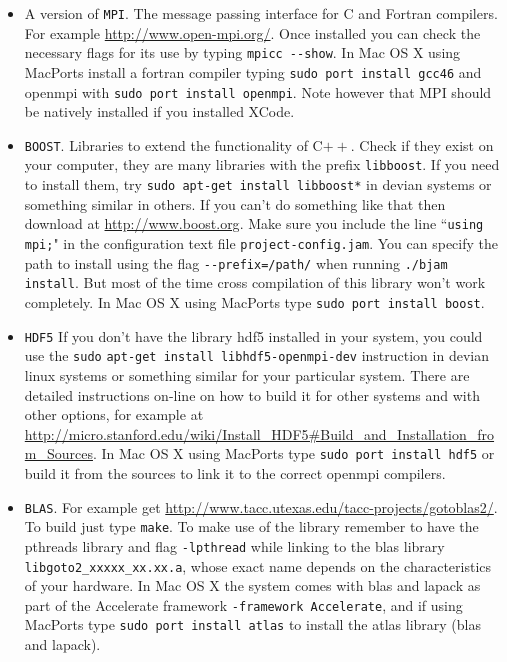 \begin{itemize}
\item A version of \verb!MPI!.
The message passing interface for C and Fortran compilers. For example \url{http://www.open-mpi.org/}. 
Once installed you can check the necessary flags for its use by typing 
\verb!mpicc --show!. 
In Mac OS X using MacPorts install a fortran compiler typing 
\verb!sudo port install gcc46! and openmpi with \verb!sudo port install openmpi!. Note however that MPI should be natively installed if you installed XCode.
  
\item \verb!BOOST!.
Libraries to extend the functionality of C$++$. Check if they exist on your computer, they are many 
libraries with the prefix \verb!libboost!. 
If you need to install them, try \verb!sudo apt-get install libboost*! in devian systems or 
something similar in others. 
If you can't do something like that then download at \url{http://www.boost.org}. 
Make sure you include the line ``\verb!using mpi;!" in the configuration text file \verb!project-config.jam!.
You can specify the path to install using the flag \verb!--prefix=/path/! when running \verb!./bjam! 
\verb!install!. But most of the time cross compilation of this library won't work completely. 
In Mac OS X using MacPorts type \verb!sudo port install boost!.

\item \verb!HDF5!
If you don't have the library hdf5 installed in your system, you could use the 
\verb!sudo! \verb!apt-get install libhdf5-openmpi-dev! instruction in devian linux systems or something similar 
for your particular system. There are detailed instructions on-line on how to build it for other systems and 
with other options, for example at \url{http://micro.stanford.edu/wiki/Install_HDF5#Build_and_Installation_from_Sources}.
In Mac OS X using MacPorts type \verb!sudo port install hdf5! or build it from the sources to link it to the correct 
openmpi compilers.

\item \verb!BLAS!.
For example get \url{http://www.tacc.utexas.edu/tacc-projects/gotoblas2/}. To build just type \verb!make!. 
To make use of the library remember to 
have the pthreads library and flag  \verb!-lpthread! while linking to the blas library  \verb!libgoto2_xxxxx_xx.xx.a!,
whose exact name depends on the characteristics of your hardware. In Mac OS X 
the system comes with blas and lapack as part of the Accelerate framework \verb!-framework Accelerate!, 
and if using MacPorts type 
\verb!sudo port install atlas! to install the atlas library (blas and lapack).


\end{itemize}
